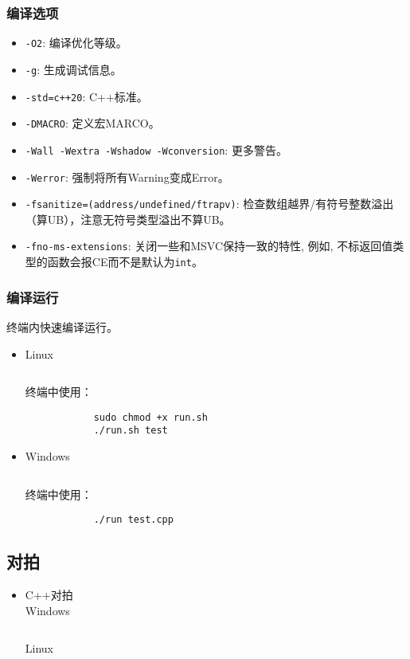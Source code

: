 \documentclass[a4paper, twoside]{article}
\begin{document}
    \subsubsection{编译选项}
    \begin{itemize}
        \item \texttt{-O2}: 编译优化等级。
        \item \texttt{-g}: 生成调试信息。
        \item \texttt{-std=c++20}: C++标准。
        \item \texttt{-DMACRO}: 定义宏MARCO。
        \item \texttt{-Wall -Wextra -Wshadow -Wconversion}: 更多警告。
        \item \texttt{-Werror}: 强制将所有Warning变成Error。
        \item \texttt{-fsanitize=(address/undefined/ftrapv)}: 检查数组越界/有符号整数溢出（算UB），注意无符号类型溢出不算UB。
        \item \texttt{-fno-ms-extensions}: 关闭一些和MSVC保持一致的特性, 例如, 不标返回值类型的函数会报CE而不是默认为\texttt{int}。
    \end{itemize}

    \subsubsection{编译运行}
    终端内快速编译运行。
    \begin{itemize}
        \item Linux
        \inputminted{bash}{../src/附录/环境测试/Linux编译运行脚本.sh}
        终端中使用：
        \begin{verbatim}
            sudo chmod +x run.sh
            ./run.sh test        
        \end{verbatim}
        \item Windows
        \inputminted{batch}{../src/附录/环境测试/Windows编译运行脚本.bat}
        终端中使用：
        \begin{verbatim}
            ./run test.cpp     
        \end{verbatim}
    \end{itemize}

\subsection{对拍}
\begin{itemize}
    \item C++对拍\\
    Windows
    \inputminted{cpp}{../src/附录/C++对拍（Windows）.cpp}

    Linux
    \inputminted{cpp}{../src/附录/C++对拍（Linux）.cpp}
\end{itemize}
\end{document}
